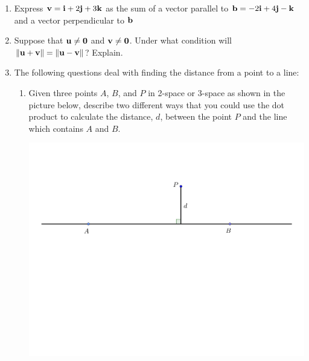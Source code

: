 \documentclass[12pt]{article}
\newif\ifans
\begin{document}
\begin{enumerate}
\begin{enumerate}
\end{enumerate}

\item Express ${\bf v}={\bf i}+2{\bf j}+3{\bf k}$ as the sum of a vector parallel to ${\bf b}=-2{\bf i}+4{\bf j}-{\bf k}$ and a vector perpendicular to ${\bf b}$

\ifans{\fbox{${\bf v}=\left\langle-\frac{2}{7},\frac{4}{7},-\frac{1}{7}\right\rangle+\left\langle \frac{9}{7},\frac{10}{7},\frac{22}{7}\right\rangle$; Detailed Solution: \textcolor{blue}{\href{http://www.math.drexel.edu/classes/Calculus/resources/Math200HW/Solutions/03_200_Dot_Product_08.pdf}{Here}} }} \fi

\item Suppose that ${\bf u} \neq {\bf 0}$ and ${\bf v} \neq {\bf 0}$.  Under what condition will $\|{\bf u}+{\bf v}\|=\|{\bf u}-{\bf v}\|$?  Explain.

\ifans{\fbox{The result follows if ${\bf u}$ is orthogonal to ${\bf v}$; Detailed Solution: \textcolor{blue}{\href{http://www.math.drexel.edu/classes/Calculus/resources/Math200HW/Solutions/03_200_Dot_Product_09.pdf}{Here}}}} \fi

\newpage

\item The following questions deal with finding the distance from a point to a line:

\begin{enumerate}

\item Given three points $A$, $B$, and $P$ in 2-space or 3-space as shown in the picture below, describe two different ways that you could use the dot product to calculate the distance, $d$, between the point $P$ and the line which contains $A$ and $B$.

\begin{center}
\includegraphics[scale=0.5]{length.pdf}
\end{center}


\end{enumerate}
\end{enumerate}
\end{document}
